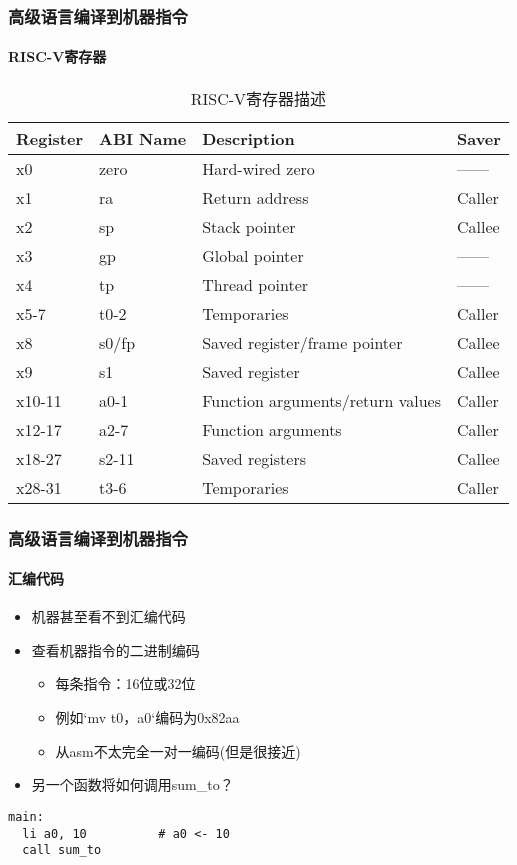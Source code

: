 \begin{frame}[plain]
	
	\frametitle{高级语言编译到机器指令}
	\framesubtitle{RISC-V寄存器}	
	\begin{table}[h]
		\caption{RISC-V寄存器描述}\small
		\begin{tabular}{|l|l|l|l|}
			\hline
			Register & ABI Name & Description                      & Saver  \\\hline
			x0       & zero     & Hard-wired zero                  & ------ \\\hline
			x1       & ra       & Return address                   & Caller \\\hline
			x2       & sp       & Stack pointer                    & Callee \\\hline
			x3       & gp       & Global pointer                   & ------ \\\hline
			x4       & tp       & Thread pointer                   & ------ \\\hline
			x5-7     & t0-2     & Temporaries                      & Caller \\\hline
			x8       & s0/fp    & Saved register/frame pointer     & Callee \\\hline
			x9       & s1       & Saved register                   & Callee \\\hline
			x10-11   & a0-1     & Function arguments/return values & Caller \\\hline
			x12-17   & a2-7     & Function arguments               & Caller \\\hline
			x18-27   & s2-11    & Saved registers                  & Callee \\\hline
			x28-31   & t3-6     & Temporaries                      & Caller \\
			\hline
		\end{tabular}
	\end{table}
	
\end{frame}

\begin{frame}[fragile]
\frametitle{高级语言编译到机器指令}
\framesubtitle{汇编代码}
	
\begin{itemize}
	
	\item 机器甚至看不到汇编代码
	\item 查看机器指令的二进制编码
	\begin{itemize}
		\item 每条指令：16位或32位
		\item 例如`mv t0，a0`编码为0x82aa
		\item 从asm不太完全一对一编码(但是很接近)
	\end{itemize}
	
	\item 另一个函数将如何调用sum\_to？
\end{itemize}	

\begin{lstlisting}
main:
  li a0, 10          # a0 <- 10
  call sum_to
\end{lstlisting}

	
\end{frame}

